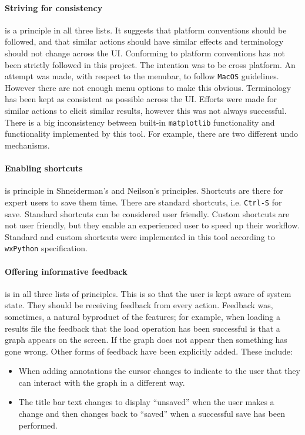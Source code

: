 \paragraph*{Striving for consistency} is a principle in all three lists.  It suggests that platform conventions should be followed, and that similar actions should have similar effects and terminology should not change across the \ac{UI}.  Conforming to platform conventions has not been strictly followed in this project.  The intention was to be cross platform.  An attempt was made, with respect to the menubar, to follow \texttt{MacOS} guidelines.  However there are not enough menu options to make this obvious.  Terminology has been kept as consistent as possible across the \ac{UI}.  Efforts were made for similar actions to elicit similar results, however this was not always successful.  There is a big inconsistency between built-in \texttt{matplotlib} functionality and functionality implemented by this tool.  For example, there are two different undo mechanisms.

\paragraph*{Enabling shortcuts} is principle in Shneiderman's and Neilson's principles.  Shortcuts are there for expert users to save them time.  There are standard shortcuts, i.e. \texttt{Ctrl-S} for save.  Standard shortcuts can be considered user friendly.  Custom shortcuts are not user friendly, but they enable an experienced user to speed up their workflow.  Standard and custom shortcuts were implemented in this tool according to \texttt{wxPython} specification.

\paragraph*{Offering informative feedback} is in all three lists of principles.  This is so that the user is kept aware of system state.  They should be receiving feedback from every action. Feedback was, sometimes, a natural byproduct of the features; for example, when loading a results file the feedback that the load operation has been successful is that a graph appears on the screen. If the graph does not appear then something has gone wrong.  Other forms of feedback have been explicitly added.  These include:
\begin{itemize}
\item When adding annotations the cursor changes to indicate to the user that they can interact with the graph in a different way.
\item The title bar text changes to display ``unsaved'' when the user makes a change and then changes back to ``saved'' when a successful save has been performed.
\end{itemize}

